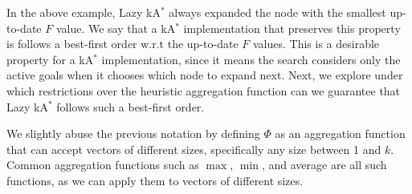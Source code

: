 \documentclass[smallextended]{svjour3}       %
\newcommand{\kastar}{kA$^*$\xspace}
\begin{document}
In the above example, Lazy \kastar always expanded the node with the smallest up-to-date $F$ value. We say that a \kastar implementation that preserves this property is follows a best-first order w.r.t the up-to-date $F$ values. This is a desirable property for a \kastar implementation, since it means the search considers only the active goals when it chooses which node to expand next. 
Next, we explore under which restrictions over 
the heuristic aggregation function can we guarantee that Lazy \kastar follows such a best-first order. 



We slightly abuse the previous notation by defining $\Phi$ as an aggregation function that can accept vectors of different sizes,  specifically any size between 1 and $k$.
Common aggregation functions such as $\max$, $\min$, and average are all such functions, as we can apply them to vectors of different sizes. 
\end{document}
